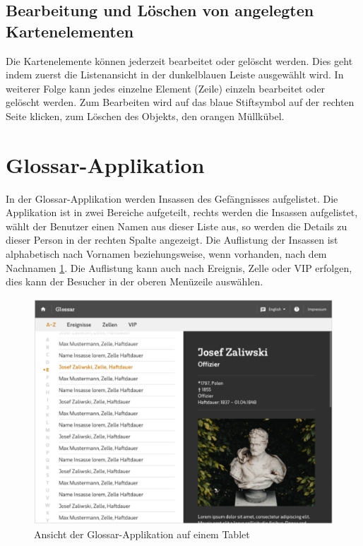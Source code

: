 \subsection{Bearbeitung und Löschen von angelegten Kartenelementen}

Die Kartenelemente können jederzeit bearbeitet oder gelöscht werden. Dies geht indem zuerst die Listenansicht in der dunkelblauen Leiste ausgewählt wird. In weiterer Folge kann jedes einzelne Element (Zeile) einzeln bearbeitet oder gelöscht werden. Zum Bearbeiten wird auf das blaue Stiftsymbol auf der rechten Seite klicken, zum Löschen des Objekts, den orangen Müllkübel.

\section{Glossar-Applikation}
In der Glossar-Applikation werden Insassen des Gefängnisses aufgelistet. Die Applikation ist in zwei Bereiche aufgeteilt, rechts werden die Insassen aufgelistet, wählt der Benutzer einen Namen aus dieser Liste aus, so werden die Details zu dieser Person in der rechten Spalte angezeigt. Die Auflistung der Insassen ist alphabetisch nach Vornamen beziehungsweise, wenn vorhanden, nach dem Nachnamen \ref{img:glossar}.
Die Auflistung kann auch nach Ereignis, Zelle oder VIP erfolgen, dies kann der Besucher in der oberen Menüzeile auswählen.

\begin{figure}[ht!]
\centering
\includegraphics[width=12cm]{Figures/paula/glossar/glossar_anfang.png}
\caption{Ansicht der Glossar-Applikation auf einem Tablet}
\label{img:glossar}
\end{figure}

